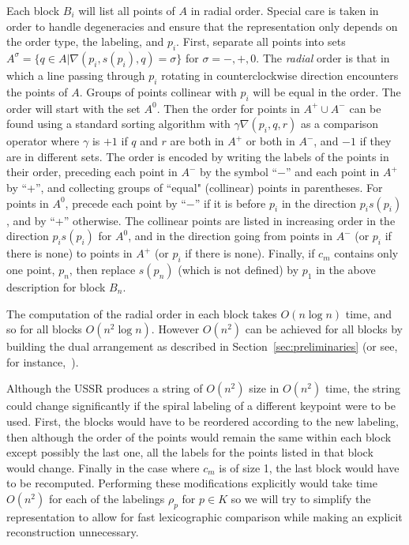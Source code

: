 \documentclass[leqno,12pt]{article}
\begin{document}
Each block $B_i$ will list all points of $A$ in
radial order. Special care is taken in order to 
handle degeneracies and ensure that the representation only depends on
the order type, the labeling, and $p_i$. First, separate all points
into sets 
$A^\sigma = \{q\in A | \nabla(p_i,s(p_i),q) = \sigma\}$
for $\sigma = -,+,0$. The {\em  radial} order is 
that in which a line
passing through $p_i$ rotating in counterclockwise
direction encounters
the points of $A$. Groups of points collinear with $p_i$ will be
equal in the order. The order will start with the set $A^0$. Then
the order for points in $A^+\cup A^-$ can be found using a standard sorting
algorithm with $\gamma\nabla(p_i,q,r)$ as a comparison operator where
$\gamma$ is $+1$ if $q$ and $r$ are both in $A^+$ or both in $A^-$,
and $-1$ if they are in different sets.  
The order is  encoded by writing the labels of the points in their
order, preceding each point in $A^-$ by the symbol ``$-$'' and each
point in $A^+$ by ``+'', and collecting
groups of ``equal" (collinear) points in parentheses. 
For points in $A^0$, precede each point by ``$-$'' if it is before $p_i$
in the direction $p_is(p_i)$, and by ``+'' otherwise.
The collinear
points are listed in increasing order in the direction $p_is(p_i)$ for
$A^0$, and in the direction going from points in $A^-$ (or $p_i$ if
there is none) to points in $A^+$ (or $p_i$ if there is none). 
Finally, if $c_m$ contains only one point, $p_n$, then replace
$s(p_n)$ (which is not defined) by $p_1$ in the above description for
block $B_n$.

The computation of the radial order in each block takes $O(n\log n)$
time, and so for all blocks $O(n^2 \log n)$. 
However $O(n^2)$ can be
achieved for all blocks by building the dual arrangement as described in
Section~\ref{sec:preliminaries} (or see, for
instance,~\cite{DBLP:journals/dm/GilSW92}).

Although the USSR produces a string of $O(n^2)$ size in $O(n^2)$
time, the string could change significantly if the spiral labeling of a
different keypoint were to be used. First, the blocks would have to be
reordered according to the new labeling, then although the order of
the points would remain the same within each block except possibly the
last one, all the labels for the points listed in that block would
change. Finally in the case where $c_m$ is of size 1, the last block would
have to be recomputed. Performing these modifications explicitly
would take time $O(n^2)$ for each of the labelings $\rho_p$ for
$p\in K$ so we will try to simplify the representation to allow for
fast lexicographic comparison while making an
explicit reconstruction unnecessary.\\
\end{document}
